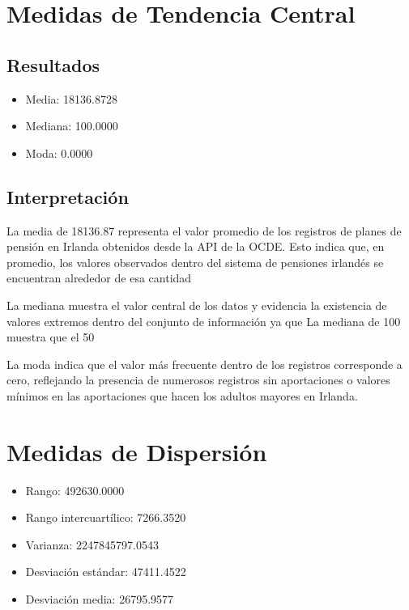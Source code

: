 \documentclass[12pt]{article}
\begin{document}
\section{Medidas de Tendencia Central}

\subsection{Resultados}

\begin{itemize}
    \item Media: 18136.8728
    \item Mediana: 100.0000
    \item Moda: 0.0000
\end{itemize}

\subsection{Interpretación}

La media de 18136.87 representa el valor promedio de los registros de planes de pensión en Irlanda obtenidos desde la API de la OCDE. Esto indica que, en promedio, los valores observados dentro del sistema de pensiones irlandés se encuentran alrededor de esa cantidad

La mediana muestra el valor central de los datos y evidencia la existencia de valores extremos dentro del conjunto de información ya que La mediana de 100 muestra que el 50%

La moda indica que el valor más frecuente dentro de los registros corresponde a cero, reflejando la presencia de numerosos registros sin aportaciones o valores mínimos en las aportaciones que hacen los adultos mayores en Irlanda.


\section{Medidas de Dispersión}

\begin{itemize}
    \item Rango: 492630.0000
    \item Rango intercuartílico: 7266.3520
    \item Varianza: 2247845797.0543
    \item Desviación estándar: 47411.4522
    \item Desviación media: 26795.9577
\end{itemize}
\end{document}
